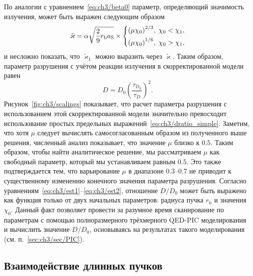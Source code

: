 По аналогии с уравнением~\eqref{eq:ch3/beta0} параметр, определяющий значимость излучения, может быть выражен следующим образом
\begin{equation}
    \tilde\varkappa = \alpha \sqrt{ \frac{2}{9} r_\mathrm{b} a_\mathrm{S}} \times
    \begin{dcases}
        {\left( \mu\chi_0 \right)}^{2/3} ,\; \chi_0 < \chi_1, \\
        {\left( \mu\chi_0 \right)}^{1/6} ,\; \chi_0 > \chi_1,
    \end{dcases}
\end{equation}
и несложно показать, что $\tilde\varkappa_1$ можно выразить через $\tilde\varkappa$.
Таким образом, параметр разрушения с учётом реакции излучения в скорректированной модели равен
\begin{equation}
    D = {D_0} \left(\frac{\tau_{D_0}}{\tau_D}\right)^2.
\end{equation}
Рисунок~\ref{fig:ch3/scalings} показывает, что расчет параметра разрушения с использованием этой скорректированной модели значительно превосходит использование простых предельных выражений~\eqref{eq:ch3/dratio_simple}.
Заметим, что хотя $\mu$ следует вычислять самосогласованным образом из полученного выше решения, численный анализ показывает, что значение $\mu$ близко к $0.5$.
Таким образом, чтобы найти аналитическое решение, мы рассматриваем $\mu$ как свободный параметр, который мы устанавливаем равным $0.5$.
Это также подтверждается тем, что варьирование $\mu$ в диапазоне 0.3--0.7 не приводит к существенному изменению конечного значения параметра разрушения.
Согласно уравнениям~\eqref{eq:ch3/est1}--\eqref{eq:ch3/est2}, отношение $D/D_0$ может быть выражено как функция только от двух начальных параметров: радиуса пучка $r_\mathrm{b}$ и значения $\chi_0$.
Данный факт позволяет провести за разумное время сканирование по параметрам с помощью полноразмерного трёхмерного QED-PIC моделирования и вычислить значение $D/D_0$, основываясь на результатах такого моделирования (см. п.~\ref{sec:ch3/sec/PIC}).

\subsection{Взаимодействие длинных пучков}
\label{sub:ch3/sec3/Long}

